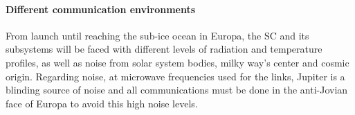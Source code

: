 \paragraph{Different communication environments}
From launch until reaching the sub-ice ocean in Europa, the SC and its subsystems will be faced with different levels of radiation and temperature profiles, as well as noise from solar system bodies, milky way's center and cosmic origin. Regarding noise, at microwave frequencies used for the links, Jupiter is a blinding source of noise and all communications must be done in the anti-Jovian face of Europa to avoid this high noise levels.

